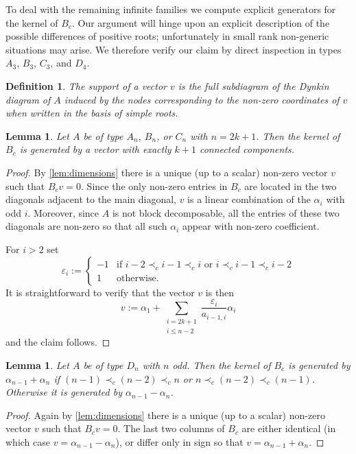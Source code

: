 \documentclass[11pt]{amsart}
\newtheorem{definition}[theorem]{Definition}
\newtheorem{lemma}[theorem]{Lemma}
\numberwithin{equation}{section}
\begin{document}
  To deal with the remaining infinite families we compute explicit generators for the kernel of $B_c$. 
  Our argument will hinge upon an explicit description of the possible differences of positive roots; unfortunately in small rank non-generic situations may arise.
  We therefore verify our claim by direct inspection in types $A_3$, $B_3$, $C_3$, and $D_4$.

  \begin{definition}
    The \emph{support} of a vector $v$ is the full subdiagram of the Dynkin diagram of $A$ induced by the nodes corresponding to the non-zero coordinates of $v$ when written in the basis of simple roots.
  \end{definition}

  \begin{lemma}
    Let $A$ be of type $A_n$, $B_n$, or $C_n$ with $n=2k+1$.
    Then the kernel of $B_c$ is generated by a vector with exactly $k+1$ connected components.
  \end{lemma}
  \begin{proof}
    By \cref{lem:dimensions} there is a unique (up to a scalar) non-zero vector $v$ such that $B_cv=0$.
    Since the only non-zero entries in $B_c$ are located in the two diagonals adjacent to the main diagonal, $v$ is a linear combination of the $\alpha_i$ with odd $i$.
    Moreover, since $A$ is not block decomposable, all the entries of these two diagonals are non-zero so that all such $\alpha_i$ appear with non-zero coefficient.

    For $i>2$ set 
    \[
      \varepsilon_i :=
      \begin{cases}
        -1 & \text{if $i-2\prec_c i-1 \prec_c i$ or $i\prec_c i-1 \prec_c i-2$}\\
        1 & \text{otherwise.}
      \end{cases}
    \]
    It is straightforward to verify that the vector $v$ is then
    \begin{equation}
      \label{eq:vector}
      v := 
      \alpha_1 + \sum_{\substack{i=2k+1\\i\leq n-2}} \frac{\varepsilon_i}{a_{i-1,i}} \alpha_i
    \end{equation}
    and the claim follows.
  \end{proof}
  
  \begin{lemma}
    \label{lem:ker_Dn_even}
    Let $A$ be of type $D_n$ with $n$ odd.
    Then the kernel of $B_c$ is generated by $\alpha_{n-1}+\alpha_n$ if $(n-1) \prec_c (n-2) \prec_c n$ or $n \prec_c (n-2) \prec_c (n-1)$.
    Otherwise it is generated by $\alpha_{n-1}-\alpha_n$.
  \end{lemma}
  \begin{proof}
    Again by \cref{lem:dimensions} there is a unique (up to a scalar) non-zero vector $v$ such that $B_cv=0$.
    The last two columns of $B_c$ are either identical (in which case $v=\alpha_{n-1}-\alpha_n$), or differ only in sign so that $v=\alpha_{n-1}+\alpha_n$.
  \end{proof}
\end{document}
